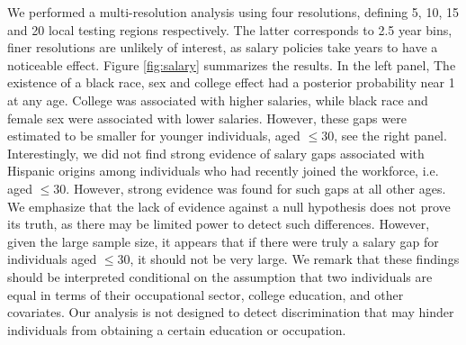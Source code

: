 
We performed a multi-resolution analysis using  four resolutions, defining 5, 10, 15 and 20 local testing regions respectively. The latter corresponds to 2.5 year bins, finer resolutions are unlikely of interest, as salary policies take years to have a noticeable effect.  
Figure \ref{fig:salary} summarizes the results. 
In the left panel, The existence of a black race, sex and college effect had a posterior probability near 1 at any age.
College was associated with higher salaries, while black race and female sex were associated with lower salaries.
However, these gaps were estimated to be smaller for younger individuals, aged $\leq 30$, see the right panel. 
Interestingly, we did not find strong evidence of salary gaps associated with Hispanic origins among individuals who had recently joined the workforce, i.e. aged $\leq 30$. However, strong evidence was found for such gaps at all other ages.
We emphasize  that the lack of evidence against a null hypothesis does not prove its truth, as there may be limited power to detect such differences. However, given the large sample size, it appears that if there were truly a salary gap for individuals aged $\leq 30$, it should not be very large. 
We remark that these findings should be interpreted conditional on the assumption that two individuals are equal in terms of their occupational sector, college education, and other covariates. Our analysis is not designed to detect discrimination that may hinder individuals from obtaining a certain education or occupation.
 
